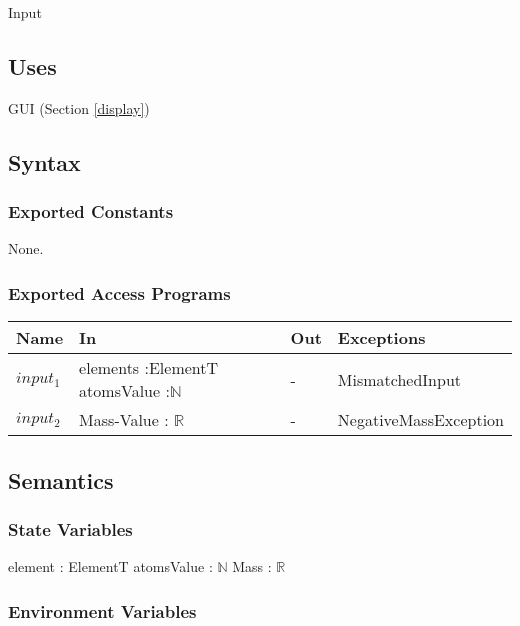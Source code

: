 \documentclass[12pt, titlepage]{article}
\begin{document}
Input

\subsection{Uses}

GUI (Section \ref{display})

\subsection{Syntax}

\subsubsection{Exported Constants}
None.

\subsubsection{Exported Access Programs}

\begin{center}
\begin{tabular}{p{2cm} p{4cm} p{4cm} p{2cm}}
\hline
\textbf{Name} & \textbf{In} & \textbf{Out} & \textbf{Exceptions} \\
\hline
{$input_1$} & elements :ElementT \newline 
                           atomsValue :$\mathbb{N}$ & - & MismatchedInput  \\
{$input_2$} & Mass-Value : $\mathbb{R}$ & - & NegativeMassException  \\
\hline
\end{tabular}
\end{center}

\subsection{Semantics}

\subsubsection{State Variables}

element : ElementT
\newline
atomsValue : $\mathbb{N}$
\newline
Mass : $\mathbb{R}$

\subsubsection{Environment Variables}
\end{document}
